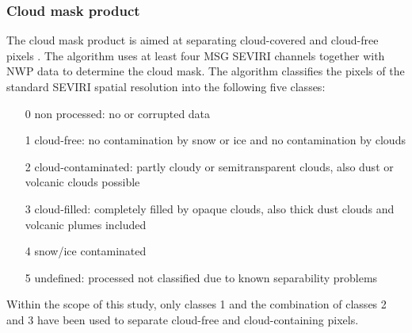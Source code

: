 \subsubsection{Cloud mask product}
The cloud mask product is aimed at separating cloud-covered and cloud-free pixels \citep{NWCSAFWolken2014}. The algorithm uses at least four MSG SEVIRI channels together with NWP data to determine the cloud mask. The algorithm classifies the pixels of the standard SEVIRI spatial resolution into the following five classes:

\begin{itemize}
\item[0] non processed: no or corrupted data
\item[1] cloud-free: no contamination by snow or ice and no contamination by clouds
\item[2] cloud-contaminated: partly cloudy or semitransparent clouds, also dust or volcanic clouds possible
\item[3] cloud-filled: completely filled by opaque clouds, also thick dust clouds and volcanic plumes included
\item[4] snow/ice contaminated
\item[5] undefined: processed not classified due to known separability problems
\end{itemize}

Within the scope of this study, only classes 1 and the combination of classes 2 and 3 have been used to separate cloud-free and cloud-containing pixels. 

